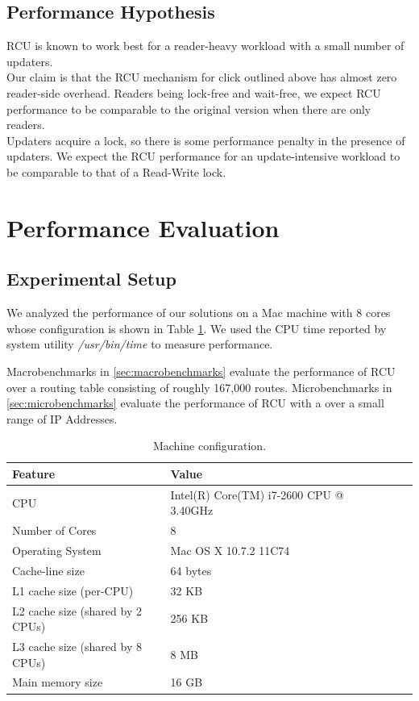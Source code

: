 \documentclass{article}
\begin{document}
\subsection{Performance Hypothesis}
RCU is known to work best for a reader-heavy workload with a small number of updaters.
\\Our claim is that the RCU mechanism for click outlined above has almost zero reader-side overhead. Readers being lock-free and wait-free, we expect RCU performance to be comparable to the original version when there are only readers.
\\Updaters acquire a lock, so there is some performance penalty in the presence of updaters. We expect the RCU performance for an update-intensive workload to be comparable to that of a Read-Write lock.

\section{Performance Evaluation}
\subsection{Experimental Setup}
We analyzed the performance of our solutions on a Mac machine with 8 cores whose configuration is shown in Table \ref{tbl:machinemac}.
We used the CPU time reported by system utility \emph{/usr/bin/time} to measure performance.

Macrobenchmarks in  \ref{sec:macrobenchmarks} evaluate the performance of RCU over a routing table consisting of roughly 167,000 routes. Microbenchmarks in \ref{sec:microbenchmarks} evaluate the performance of RCU with a over a small range of IP Addresses.

\begin{table}
\begin{center}
\begin{tabular}{|l|l|l|l|l|l|}
\hline Feature & Value\\
\hline CPU &Intel(R) Core(TM) i7-2600 CPU @ 3.40GHz\\
\hline Number of Cores & 8\\
\hline Operating System & Mac OS X 10.7.2 11C74\\
\hline Cache-line size & 64 bytes\\
\hline L1 cache size (per-CPU) & 32 KB\\
\hline L2 cache size (shared by 2 CPUs) & 256 KB\\
\hline L3 cache size (shared by 8 CPUs)& 8 MB\\
\hline Main memory size & 16 GB\\
\hline
\end{tabular}
\end{center}
\caption{Machine configuration.}
\label{tbl:machinemac}
\end{table}
\end{document}
